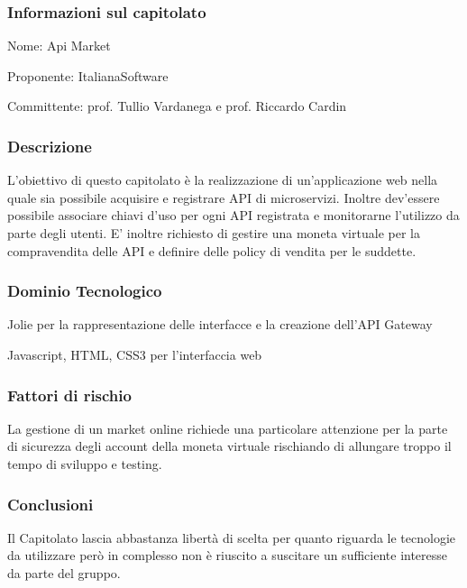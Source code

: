 \subsubsection{Informazioni sul capitolato}
\begin{trivlist}
	\setlength{\itemindent}{+.3in}
	\item  Nome: Api Market
	\item  Proponente: ItalianaSoftware
	\item  Committente: prof. Tullio Vardanega e prof. Riccardo Cardin
\end{trivlist}

\subsubsection{Descrizione}

L'obiettivo di questo capitolato è la realizzazione di un'applicazione web nella quale sia possibile acquisire e registrare API di microservizi.
Inoltre dev'essere possibile associare chiavi d'uso per ogni API registrata e monitorarne l'utilizzo da parte degli utenti.
E' inoltre richiesto di gestire una moneta virtuale per la compravendita delle API e definire delle policy di vendita per le suddette.

\subsubsection{Dominio Tecnologico}
\begin{trivlist}
	\item Jolie per la rappresentazione delle interfacce e la creazione	dell'API Gateway
	\item Javascript, HTML, CSS3 per l'interfaccia web
\end{trivlist}

\subsubsection{Fattori di rischio}

La gestione di un market online richiede una particolare attenzione per la parte di sicurezza degli account della moneta virtuale rischiando di allungare troppo il tempo di sviluppo e testing.

\subsubsection{Conclusioni}

Il Capitolato lascia abbastanza libertà di scelta per quanto riguarda le tecnologie da utilizzare però in complesso non è riuscito a suscitare un sufficiente interesse da parte del gruppo.


